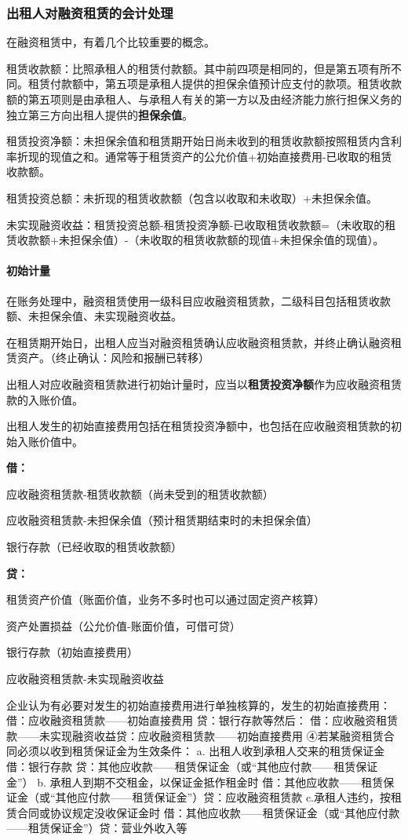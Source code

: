 \documentclass[UTF8,12pt]{ctexart}
\newenvironment{Dr}{%
	\begin{list}{}%
		{
			\setlength{\leftmargin}{2em}
			\setlength{\labelwidth}{2em}
			\setlength{\labelsep}{0pt}
			\setlength{\itemindent}{0pt}
			\setlength{\listparindent}{0pt}
			\setlength{\parsep}{0pt}
			\setlength{\topsep}{0pt}
		}
		\item[\textbf{借：}]
	}{%
	\end{list}
}
\newenvironment{Cr}{%
	\begin{list}{}%
		{
			\setlength{\leftmargin}{2em}
			\setlength{\labelwidth}{2em}
			\setlength{\labelsep}{0pt}
			\setlength{\itemindent}{0pt}
			\setlength{\listparindent}{0pt}
			\setlength{\parsep}{0pt}
			\setlength{\topsep}{0pt}
		}
		\item[\textbf{贷：}]
	}{%
	\end{list}
}
\numberwithin{equation}{section} %
\numberwithin{figure}{section}
\numberwithin{table}{section}
\begin{document}
	\subsubsection{出租人对融资租赁的会计处理}
	在融资租赁中，有着几个比较重要的概念。
	
	租赁收款额：比照承租人的租赁付款额。其中前四项是相同的，但是第五项有所不同。租赁付款额中，第五项是承租人提供的担保余值预计应支付的款项。租赁收款额的第五项则是由承租人、与承租人有关的第一方以及由经济能力旅行担保义务的独立第三方向出租人提供的\textbf{担保余值}。
	
	租赁投资净额：未担保余值和租赁期开始日尚未收到的租赁收款额按照租赁内含利率折现的现值之和。通常等于租赁资产的公允价值+初始直接费用-已收取的租赁收款额。
	
	租赁投资总额：未折现的租赁收款额（包含以收取和未收取）+未担保余值。
	
	未实现融资收益：租赁投资总额-租赁投资净额-已收取租赁收款额=（未收取的租赁收款额+未担保余值）-（未收取的租赁收款额的现值+未担保余值的现值）。
	
	\paragraph{初始计量}在账务处理中，融资租赁使用一级科目应收融资租赁款，二级科目包括租赁收款额、未担保余值、未实现融资收益。
	
	在租赁期开始日，出租人应当对融资租赁确认应收融资租赁款，并终止确认融资租赁资产。（终止确认：风险和报酬已转移）
	
	出租人对应收融资租赁款进行初始计量时，应当以\textbf{租赁投资净额}作为应收融资租赁款的入账价值。
	
	出租人发生的初始直接费用包括在租赁投资净额中，也包括在应收融资租赁款的初始入账价值中。
	\begin{Dr}
		应收融资租赁款-租赁收款额（尚未受到的租赁收款额）
		
		应收融资租赁款-未担保余值（预计租赁期结束时的未担保余值）
		
		银行存款（已经收取的租赁收款额）
	\end{Dr}
	\begin{Cr}
		租赁资产价值（账面价值，业务不多时也可以通过固定资产核算）
		
		资产处置损益（公允价值-账面价值，可借可贷）
		
		银行存款（初始直接费用）
		
		应收融资租赁款-未实现融资收益
	\end{Cr}

	企业认为有必要对发生的初始直接费用进行单独核算的，发生的初始直接费用： 借：应收融资租赁款——初始直接费用
	贷：银行存款等然后：
	借：应收融资租赁款——未实现融资收益贷：应收融资租赁款——初始直接费用
	④若某融资租赁合同必须以收到租赁保证金为生效条件：
	a.	出租人收到承租人交来的租赁保证金借：银行存款
	贷：其他应收款——租赁保证金（或“其他应付款——租赁保证金”）
	b.	承租人到期不交租金，以保证金抵作租金时
	借：其他应收款——租赁保证金（或“其他应付款——租赁保证金”）贷：应收融资租赁款
	c.承租人违约，按租赁合同或协议规定没收保证金时
	借：其他应收款——租赁保证金（或“其他应付款——租赁保证金”）贷：营业外收入等
	
\end{document}
